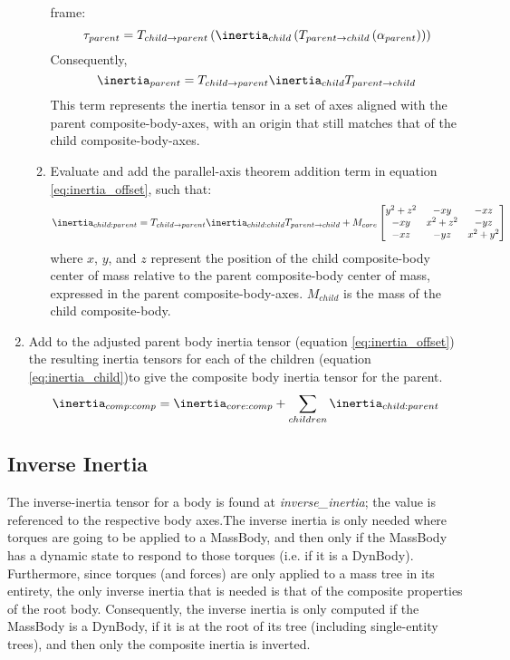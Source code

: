 \begin{enumerate}
\begin{enumerate}
  frame:
  \begin{equation*}
   \tau_{parent} = T_{child \rightarrow parent} \left( \inertia_{child}  
   \left( T_{parent \rightarrow child} \left( \alpha_{parent} \right) \right) 
   \right)
  \end{equation*}
 Consequently,\begin{equation}
   \inertia_{parent} = T_{child \rightarrow parent}  \inertia_{child}   
   T_{parent \rightarrow child}
  \end{equation} 
  This term represents the inertia tensor in a set of axes aligned with the 
  parent composite-body-axes, with an origin that still matches that of the 
  child composite-body-axes.
  \item Evaluate and add the parallel-axis theorem addition term in equation 
  \ref{eq:inertia_offset}, such that:
  \begin{equation}\label{eq:inertia_child}
   \inertia_{child:parent} = T_{child \rightarrow parent}  
   \inertia_{child:child}   T_{parent \rightarrow child} + M_{core} 
   \begin{bmatrix} y^2 + z^2 & -xy & -xz \\-xy & x^2 + z^2 & -yz \\ -xz & -yz 
   & x^2+y^2 \end{bmatrix}
  \end{equation}
  where $x$, $y$, and $z$ represent the position of the child composite-body 
  center of mass relative to the parent composite-body center of mass, 
  expressed in the parent composite-body-axes.  $M_{child}$ is the mass of the 
  child composite-body.
  
 \end{enumerate}
 \item Add to the adjusted parent body inertia tensor (equation 
 \ref{eq:inertia_offset}) the resulting inertia tensors for each of the 
 children (equation \ref{eq:inertia_child})to give the composite body inertia 
 tensor for the parent.\begin{equation}
  \inertia_{comp:comp} = \inertia_{core:comp} + \sum_{children} 
  \inertia_{child:parent}
 \end{equation}
 
 \end{enumerate}




\subsection{Inverse Inertia}
The inverse-inertia tensor for a body is found at 
\textit{inverse\_inertia}; the value is referenced to the respective body 
axes.The inverse inertia is only needed where torques are going to be applied 
to a 
MassBody, and then only if the MassBody has a dynamic state to respond to 
those torques (i.e. if it is a DynBody).  Furthermore, since torques (and 
forces) are only applied to a mass tree in its entirety, the only inverse 
inertia that is needed is that of the composite properties of the root body.  
Consequently, the inverse inertia is only computed if the MassBody is a 
DynBody, if it is at the root of its tree (including single-entity trees), and 
then only the composite inertia is inverted.

